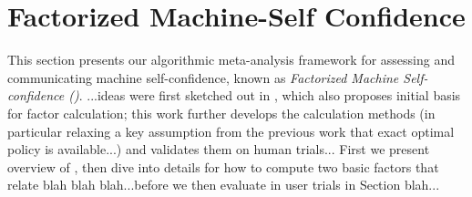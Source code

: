 \section{Factorized Machine-Self Confidence}

This section presents our algorithmic meta-analysis framework for assessing and communicating machine self-confidence, known as \textit{Factorized Machine Self-confidence (\famsec{})}.  ...ideas were first sketched out in \cite{Aitken2016-cv}, which also proposes initial basis for factor calculation; this work further develops the calculation methods (in particular relaxing a key assumption from the previous work that exact optimal policy is available...) and validates them on human trials... First we present overview of \famsec{}, then dive into details for how to compute two basic factors that relate blah blah blah...before we then evaluate in user trials in Section blah...




